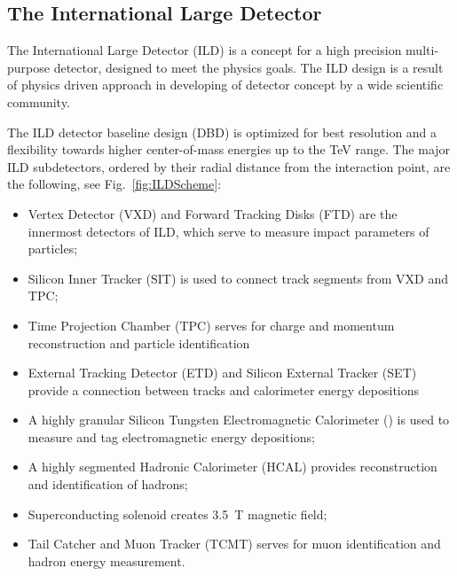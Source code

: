 
\subsection{The International Large Detector}


The International Large Detector (ILD) is a concept for a high precision multi-purpose detector, designed to meet the physics goals.
The ILD design is a result of physics driven approach in developing of detector concept by a wide scientific community. 

The ILD detector baseline design (DBD) is optimized for best resolution and a flexibility towards higher center-of-mass energies up to the TeV range.
The major ILD subdetectors, ordered by their radial distance from the interaction point, are the following, see Fig.~\ref{fig:ILDScheme}:
\begin{itemize}
\item Vertex Detector (VXD) and Forward Tracking Disks (FTD) are the innermost detectors of ILD, which serve to measure impact parameters of particles;
\item Silicon Inner Tracker (SIT) is used to connect track segments from VXD and TPC;
\item Time Projection Chamber (TPC) serves for charge and momentum reconstruction and particle identification
\item External Tracking Detector (ETD) and Silicon External Tracker (SET) provide a connection between tracks and calorimeter energy depositions 
\item A highly granular Silicon Tungsten Electromagnetic Calorimeter (\ecal) is used to measure and tag electromagnetic energy depositions;
\item A highly segmented Hadronic Calorimeter (HCAL) provides reconstruction and identification of hadrons;
\item Superconducting solenoid creates 3.5~T magnetic field;
\item Tail Catcher and Muon Tracker (TCMT) serves for muon identification and hadron energy measurement.
\end{itemize}



